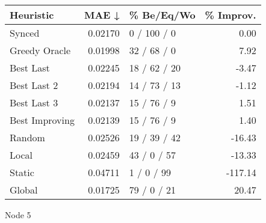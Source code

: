 \begin{tabular}{lrlr}
\toprule
\textbf{Heuristic} & \textbf{MAE ↓} & \textbf{\% Be/Eq/Wo} & \textbf{\% Improv.} \\
\midrule
            Synced &        0.02170 &          0 / 100 / 0 &                0.00 \\
     Greedy Oracle &        0.01998 &          32 / 68 / 0 &                7.92 \\
         Best Last &        0.02245 &         18 / 62 / 20 &               -3.47 \\
       Best Last 2 &        0.02194 &         14 / 73 / 13 &               -1.12 \\
       Best Last 3 &        0.02137 &          15 / 76 / 9 &                1.51 \\
    Best Improving &        0.02139 &          15 / 76 / 9 &                1.40 \\
            Random &        0.02526 &         19 / 39 / 42 &              -16.43 \\
             Local &        0.02459 &          43 / 0 / 57 &              -13.33 \\
            Static &        0.04711 &           1 / 0 / 99 &             -117.14 \\
            Global &        0.01725 &          79 / 0 / 21 &               20.47 \\
\bottomrule
\end{tabular}
\caption{Node 5}
\label{tab:non_lr05_le1_bs2_5}

